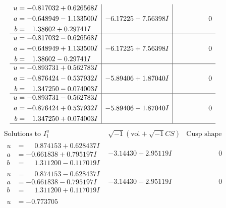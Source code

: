 \documentclass[1p]{elsarticle_modified}
\theoremstyle{definition}
\newcommand{\I}{\sqrt{-1}}
\begin{document}
$$\begin{array}{c|c|c}
\begin{aligned}
u &= -0.817032 + 0.626568 I \\
a &= -0.648949 - 1.133500 I \\
b &= \phantom{-}1.38602 + 0.29741 I\end{aligned}
 & -6.17225 - 7.56398 I & \phantom{-0.000000 } 0 \\ \hline\begin{aligned}
u &= -0.817032 - 0.626568 I \\
a &= -0.648949 + 1.133500 I \\
b &= \phantom{-}1.38602 - 0.29741 I\end{aligned}
 & -6.17225 + 7.56398 I & \phantom{-0.000000 } 0 \\ \hline\begin{aligned}
u &= -0.893731 + 0.562783 I \\
a &= -0.876424 - 0.537932 I \\
b &= \phantom{-}1.347250 - 0.074003 I\end{aligned}
 & -5.89406 + 1.87040 I & \phantom{-0.000000 } 0 \\ \hline\begin{aligned}
u &= -0.893731 - 0.562783 I \\
a &= -0.876424 + 0.537932 I \\
b &= \phantom{-}1.347250 + 0.074003 I\end{aligned}
 & -5.89406 - 1.87040 I & \phantom{-0.000000 } 0\\
 \hline 
 \end{array}$$\newpage$$\begin{array}{c|c|c}  
\text{Solutions to }I^u_{1}& \I (\text{vol} + \sqrt{-1}CS) & \text{Cusp shape}\\
 \hline 
\begin{aligned}
u &= \phantom{-}0.874153 + 0.628437 I \\
a &= -0.661838 + 0.795197 I \\
b &= \phantom{-}1.311200 - 0.117019 I\end{aligned}
 & -3.14430 + 2.95119 I & \phantom{-0.000000 } 0 \\ \hline\begin{aligned}
u &= \phantom{-}0.874153 - 0.628437 I \\
a &= -0.661838 - 0.795197 I \\
b &= \phantom{-}1.311200 + 0.117019 I\end{aligned}
 & -3.14430 - 2.95119 I & \phantom{-0.000000 } 0 \\ \hline\begin{aligned}
u &= -0.773705\phantom{ +0.000000I} \\

\end{aligned}
\end{array}$$
\end{document}
